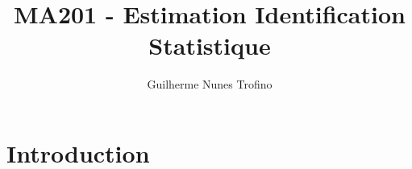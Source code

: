 \documentclass{article}
\title{MA201 - Estimation Identification Statistique}
\author{Guilherme Nunes Trofino}
\begin{document}
\maketitle

\newpage\tableofcontents

\section{Introduction}
\subsection{}
\end{document}
